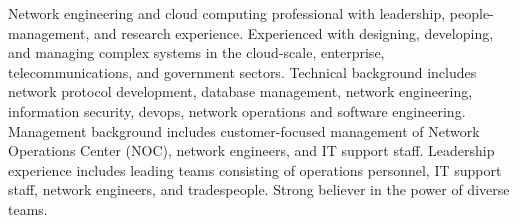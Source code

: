 \documentclass[letter,10pt]{article}
\begin{document}

\noindent
Network engineering and cloud computing professional with leadership,
people-management, and research experience.  Experienced with designing,
developing, and managing complex systems in the cloud-scale, enterprise,
telecommunications, and government sectors.  Technical background
includes network protocol development, database management, network
engineering, information security, devops, network operations and
software engineering.  Management background includes customer-focused
management of Network Operations Center (NOC), network engineers, and IT support staff.  Leadership
experience includes leading teams consisting of operations personnel, IT
support staff, network engineers, and tradespeople.  Strong believer in
the power of diverse teams.
\end{document}
